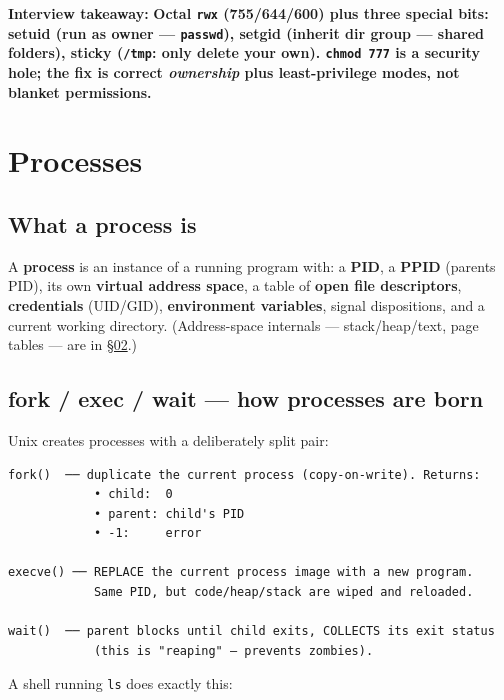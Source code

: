 \documentclass[11pt]{article}
\begin{document}
\textbf{Interview takeaway:} \textbf{Octal \texttt{rwx} (755/644/600) plus three special bits: setuid (run as owner --- \texttt{passwd}), setgid (inherit dir group --- shared folders), sticky (\texttt{/tmp}: only delete your own). \texttt{chmod\ 777} is a security hole; the fix is correct \emph{ownership} plus least-privilege modes, not blanket permissions.}

\section{Processes}\label{processes}

\subsection{What a process is}\label{what-a-process-is}

A \textbf{process} is an instance of a running program with: a \textbf{PID}, a \textbf{PPID} (parent\textquotesingle s PID), its own \textbf{virtual address space}, a table of \textbf{open file descriptors}, \textbf{credentials} (UID/GID), \textbf{environment variables}, signal dispositions, and a current working directory. (Address-space internals --- stack/heap/text, page tables --- are in \hyperlink{section.02}{\textcolor{acc}{§02}}.)

\subsection{fork / exec / wait --- how processes are born}\label{fork--exec--wait--how-processes-are-born}

Unix creates processes with a deliberately split pair:

\setcodelang{}

\begin{verbatim}
fork()  ── duplicate the current process (copy-on-write). Returns:
            • child:  0
            • parent: child's PID
            • -1:     error

execve() ── REPLACE the current process image with a new program.
            Same PID, but code/heap/stack are wiped and reloaded.

wait()  ── parent blocks until child exits, COLLECTS its exit status
            (this is "reaping" — prevents zombies).
\end{verbatim}

A shell running \texttt{ls} does exactly this:

\end{document}
